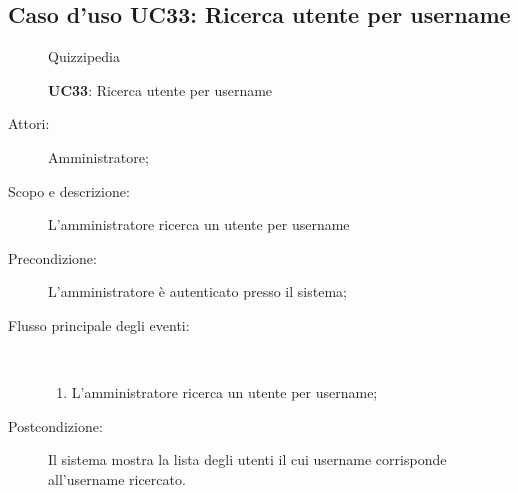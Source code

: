 \subsection{Caso d'uso UC33: Ricerca utente per username}
	\begin{figure}[H]
		\centering
		\begin{resizedtikzpicture}{\textwidth}
		\begin{umlsystem}[x=0, fill=lightgray!20]{Quizzipedia}
		\end{umlsystem}
		\end{resizedtikzpicture}
		\caption{\textbf{UC33}: Ricerca utente per username}
		\label{UC33}
	\end{figure}
\begin{description}
\item[Attori:] Amministratore;
\item[Scopo e descrizione:] L'amministratore ricerca un utente per username
      \item[Precondizione:] L'amministratore è autenticato presso il sistema;

        \item[Flusso principale degli eventi:] \ 
 \begin{enumerate}
          \item L'amministratore ricerca un utente per username;

      \end{enumerate}
    \item[Postcondizione:] Il sistema mostra la lista degli utenti il cui username corrisponde all'username ricercato.
  \end{description}
\hypertarget{UC34}{}
